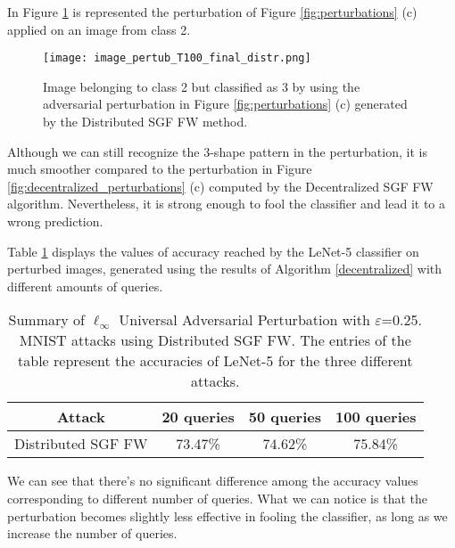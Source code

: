 In Figure \ref{fig:distributed} is represented the perturbation of Figure \ref{fig:perturbations} (c) applied on an image from class 2.

\begin{figure}[htbp]
	\centering
	\texttt{[image: image\_pertub\_T100\_final\_distr.png]}
	\caption{{\small Image belonging to class 2 but classified as 3 by using the adversarial perturbation in Figure \ref{fig:perturbations} (c) generated by the Distributed SGF FW method.}}
	\label{fig:distributed}
\end{figure}
Although we can still recognize the 3-shape pattern in the
perturbation, it is much smoother compared to the perturbation in Figure \ref{fig:decentralized_perturbations} (c) computed by the Decentralized
SGF FW algorithm. Nevertheless, it is strong enough to fool the classifier and lead it to a wrong prediction.

Table \ref{tab:distributed} displays the values of accuracy reached by the LeNet-5 classifier on perturbed images, generated using the results of Algorithm \ref{decentralized} with different amounts of queries.\\
\begin{table}[htbp]
	\begin{center}
		\begin{adjustwidth}{-.6cm}{}
			\begin{tabular}{c|ccc}
				\textbf{Attack} &          20 \textbf{queries} &      50 \textbf{queries} &     100 \textbf{queries} \\
				\midrule
				{\small Distributed SGF FW}     &   73.47\% &    74.62\% &       75.84\% \\
			\end{tabular}
		\end{adjustwidth}
	\end{center}
	\caption{{\small Summary of $\ell_\infty$ Universal Adversarial Perturbation with $\varepsilon$=0.25. MNIST attacks using Distributed SGF FW. The entries of the table represent the accuracies of LeNet-5 for the three different attacks.}}
	\label{tab:distributed}
\end{table}

We can see that there's no significant
difference among the accuracy values corresponding to different number of queries. What we can notice is that the
perturbation becomes slightly less effective in fooling the classifier, as long as we increase the number of queries.